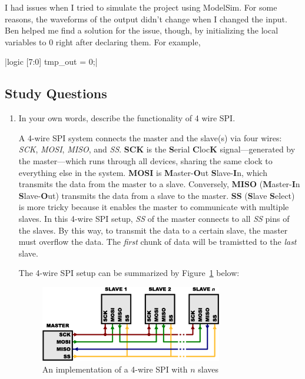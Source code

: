 \documentclass[12pt]{article}
\begin{document}
I had issues when I tried to simulate the project using ModelSim. For some reasons, the waveforms of the output didn't change when I changed the input. Ben helped me find a solution for the issue, though, by initializing the local variables to 0 right after declaring them. For example,

|logic [7:0] tmp_out = 0;|

\subsection*{Study Questions}

\begin{enumerate}
  \item In your own words, describe the functionality of 4 wire SPI.

  A 4-wire SPI system connects the master and the slave(s) via four wires: \textit{SCK}, \textit{MOSI}, \textit{MISO}, and \textit{SS}. \textbf{SCK} is the \textbf{S}erial \textbf{C}loc\textbf{K} signal---generated by the master---which runs through all devices, sharing the same clock to everything else in the system. \textbf{MOSI} is \textbf{M}aster-\textbf{O}ut \textbf{S}lave-\textbf{I}n, which transmits the data from the master to a slave. Conversely, \textbf{MISO} (\textbf{M}aster-\textbf{I}n \textbf{S}lave-\textbf{O}ut) transmits the data from a slave to the master. \textbf{SS} (\textbf{S}lave \textbf{S}elect) is more tricky because it enables the master to communicate with multiple slaves. In this 4-wire SPI setup, \textit{SS} of the master connects to all \textit{SS} pins of the slaves. By this way, to transmit the data to a certain slave, the master must overflow the data. The \textit{first} chunk of data will be tramistted to the \textit{last} slave.

  The 4-wire SPI setup can be summarized by Figure~\ref{figure:4} below:

  \begin{figure}[ht]
    \centering
    \includegraphics[width=0.75\textwidth]{spi_4_wires.png}
    \caption{An implementation of a 4-wire SPI with $n$ slaves \cite{SparkFunSpi}}
    \label{figure:4}
  \end{figure}
\end{enumerate}
\end{document}
